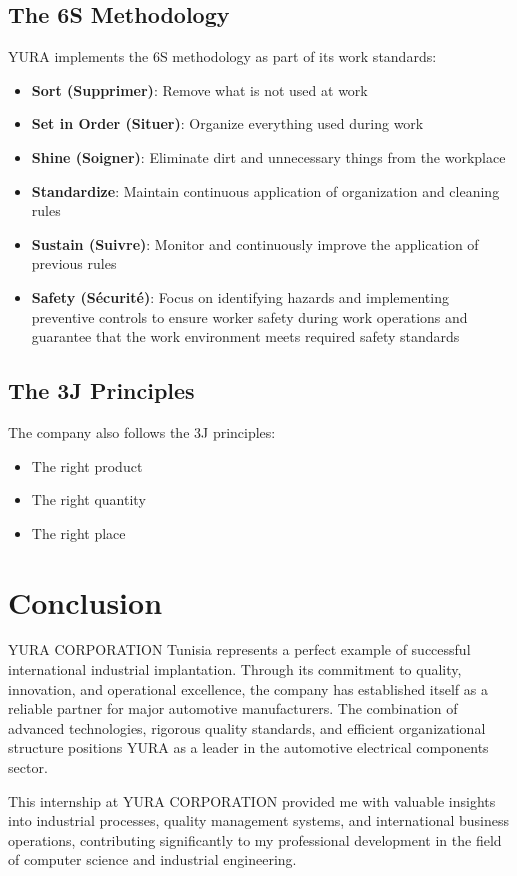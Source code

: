 \subsection{The 6S Methodology}

YURA implements the 6S methodology as part of its work standards:

\begin{itemize}
    \item \textbf{Sort (Supprimer)}: Remove what is not used at work
    \item \textbf{Set in Order (Situer)}: Organize everything used during work
    \item \textbf{Shine (Soigner)}: Eliminate dirt and unnecessary things from the workplace
    \item \textbf{Standardize}: Maintain continuous application of organization and cleaning rules
    \item \textbf{Sustain (Suivre)}: Monitor and continuously improve the application of previous rules
    \item \textbf{Safety (Sécurité)}: Focus on identifying hazards and implementing preventive controls to ensure worker safety during work operations and guarantee that the work environment meets required safety standards
\end{itemize}

\subsection{The 3J Principles}

The company also follows the 3J principles:
\begin{itemize}
    \item The right product
    \item The right quantity
    \item The right place
\end{itemize}

\section{Conclusion}

YURA CORPORATION Tunisia represents a perfect example of successful international industrial implantation. Through its commitment to quality, innovation, and operational excellence, the company has established itself as a reliable partner for major automotive manufacturers. The combination of advanced technologies, rigorous quality standards, and efficient organizational structure positions YURA as a leader in the automotive electrical components sector.

This internship at YURA CORPORATION provided me with valuable insights into industrial processes, quality management systems, and international business operations, contributing significantly to my professional development in the field of computer science and industrial engineering.
